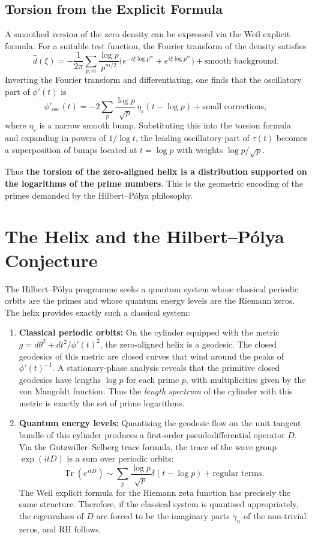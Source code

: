 \documentclass[12pt,a4paper]{article}
\begin{document}
\subsection{Torsion from the Explicit Formula}
A smoothed version of the zero density can be expressed via the Weil explicit formula. For a suitable test function, the Fourier transform of the density satisfies
\[
\widehat{d}(\xi) = -\frac{1}{2\pi}\sum_{p,m}\frac{\log p}{p^{m/2}}\bigl(e^{-i\xi\log p^m}+e^{i\xi\log p^m}\bigr) + \text{smooth background}.
\]
Inverting the Fourier transform and differentiating, one finds that the oscillatory part of \(\phi'(t)\) is
\[
\phi'_{\mathrm{osc}}(t) = -2\sum_{p}\frac{\log p}{\sqrt{p}}\,\eta_\varepsilon(t-\log p) + \text{small corrections},
\]
where \(\eta_\varepsilon\) is a narrow smooth bump. Substituting this into the torsion formula and expanding in powers of \(1/\log t\), the leading oscillatory part of \(\tau(t)\) becomes a superposition of bumps located at \(t=\log p\) with weights \(\log p/\sqrt{p}\).

Thus \textbf{the torsion of the zero‑aligned helix is a distribution supported on the logarithms of the prime numbers}. This is the geometric encoding of the primes demanded by the Hilbert–P\'olya philosophy.

\section{The Helix and the Hilbert–P\'olya Conjecture}
The Hilbert–P\'olya programme seeks a quantum system whose classical periodic orbits are the primes and whose quantum energy levels are the Riemann zeros. The helix provides exactly such a classical system:

\begin{enumerate}
\item \textbf{Classical periodic orbits:} On the cylinder equipped with the metric \(g=d\theta^2+dt^2/\phi'(t)^2\), the zero‑aligned helix is a geodesic. The closed geodesics of this metric are closed curves that wind around the peaks of \(\phi'(t)^{-1}\). A stationary‑phase analysis reveals that the primitive closed geodesics have lengths \(\log p\) for each prime \(p\), with multiplicities given by the von Mangoldt function. Thus the \emph{length spectrum} of the cylinder with this metric is exactly the set of prime logarithms.
\item \textbf{Quantum energy levels:} Quantising the geodesic flow on the unit tangent bundle of this cylinder produces a first‑order pseudodifferential operator \(D\). Via the Gutzwiller–Selberg trace formula, the trace of the wave group \(\exp(itD)\) is a sum over periodic orbits:
\[
\operatorname{Tr}(e^{itD}) \sim \sum_{p} \frac{\log p}{\sqrt{p}} \delta(t-\log p) + \text{regular terms}.
\]
The Weil explicit formula for the Riemann zeta function has precisely the same structure. Therefore, if the classical system is quantised appropriately, the eigenvalues of \(D\) are forced to be the imaginary parts \(\gamma_n\) of the non‑trivial zeros, and RH follows.
\end{enumerate}
\end{document}
